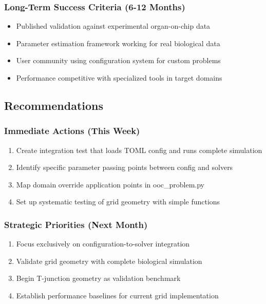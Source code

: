 \subsubsection{Long-Term Success Criteria (6-12 Months)}
\begin{itemize}
    \item Published validation against experimental organ-on-chip data
    \item Parameter estimation framework working for real biological data
    \item User community using configuration system for custom problems
    \item Performance competitive with specialized tools in target domains
\end{itemize}

\subsection{Recommendations}

\subsubsection{Immediate Actions (This Week)}
\begin{enumerate}
    \item Create integration test that loads TOML config and runs complete simulation
    \item Identify specific parameter passing points between config and solvers
    \item Map domain override application points in ooc\_problem.py
    \item Set up systematic testing of grid geometry with simple functions
\end{enumerate}

\subsubsection{Strategic Priorities (Next Month)}
\begin{enumerate}
    \item Focus exclusively on configuration-to-solver integration
    \item Validate grid geometry with complete biological simulation
    \item Begin T-junction geometry as validation benchmark
    \item Establish performance baselines for current grid implementation
\end{enumerate}

